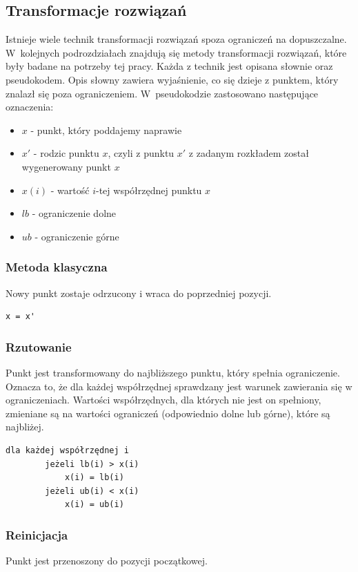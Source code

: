 \documentclass{mini}
\begin{document}
\subsection{Transformacje rozwiązań} \label{transformacje}
Istnieje wiele technik transformacji rozwiązań spoza ograniczeń na dopuszczalne. W~kolejnych podrozdziałach znajdują się metody transformacji rozwiązań, które były badane na potrzeby tej pracy. Każda z technik jest opisana słownie oraz pseudokodem. Opis słowny zawiera wyjaśnienie, co się dzieje z punktem, który znalazł się poza ograniczeniem. W~pseudokodzie zastosowano następujące oznaczenia:
\begin{itemize}[noitemsep]
\item $x$ - punkt, który poddajemy naprawie
\item $x'$ - rodzic punktu $x$, czyli z punktu $x'$ z zadanym rozkładem został wygenerowany punkt $x$
\item $x(i)$ - wartość $i$-tej współrzędnej punktu $x$
\item $lb$ - ograniczenie dolne
\item $ub$ - ograniczenie górne
\end{itemize}

\subsubsection{Metoda klasyczna}
Nowy punkt zostaje odrzucony i wraca do poprzedniej pozycji.

\begin{Verbatim}[baselinestretch=1.1]
	x = x'
\end{Verbatim}


\subsubsection{Rzutowanie}
Punkt jest transformowany do najbliższego punktu, który spełnia ograniczenie. Oznacza to, że dla każdej współrzędnej sprawdzany jest warunek zawierania się w ograniczeniach. Wartości współrzędnych, dla których nie jest on spełniony, zmieniane są na wartości ograniczeń (odpowiednio dolne lub górne), które są najbliżej.

\begin{Verbatim}[baselinestretch=1.1]
	dla każdej współrzędnej i
		jeżeli lb(i) > x(i)
			x(i) = lb(i)
		jeżeli ub(i) < x(i)
			x(i) = ub(i)
\end{Verbatim}

\subsubsection{Reinicjacja}
Punkt jest przenoszony do pozycji początkowej.
\end{document}
